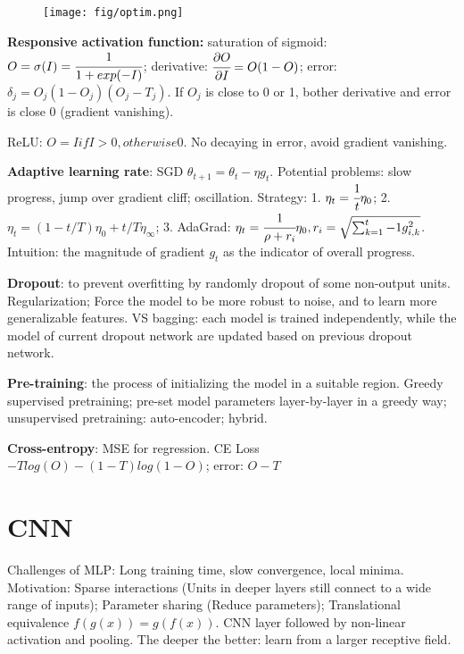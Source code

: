 \documentclass[10pt,twocolumn]{article}
\begin{document}
\begin{figure}[!ht]
\texttt{[image: fig/optim.png]}
\end{figure}

\textbf{Responsive activation function:} saturation of sigmoid: $O=\sigma(I)=\cfrac{1}{1+exp(-I)}$; derivative: $\cfrac{\partial O}{\partial I}=O(1-O)$; error: $\delta_j=O_j(1-O_j)(O_j-T_j)$. If $O_j$ is close to 0 or 1, bother derivative and error is close 0 (gradient vanishing). 

ReLU: $O=I if I >0, otherwise 0$. No decaying in error, avoid gradient vanishing. 

\textbf{Adaptive learning rate}: SGD $\theta_{t+1}=\theta_t-\eta g_t$. Potential problems: slow progress, jump over gradient cliff; oscillation. Strategy: 1. $\eta_t=\cfrac{1}{t}\eta_0$; 2. $\eta_t=(1-t/T)\eta_0+t/T\eta_\infty$; 3. AdaGrad: $\eta_t=\cfrac{1}{\rho+r_i}\eta_0, r_i=\sqrt{\sum_{k=1}^t-1{g_{i,k}^2}}$. Intuition: the magnitude of gradient $g_t$ as the indicator of overall progress. 

\textbf{Dropout}: to prevent overfitting by randomly dropout of some non-output units. Regularization; Force the model to be more robust to noise, and to learn more generalizable features. 
VS bagging: each model is trained independently, while the model of current dropout network are updated based on previous dropout network.

\textbf{Pre-training}: the process of initializing the model in a suitable region. Greedy supervised pretraining; pre-set model parameters layer-by-layer in a greedy way; unsupervised pretraining: auto-encoder; hybrid. 

\textbf{Cross-entropy}: MSE for regression. CE Loss $-Tlog(O)-(1-T)log(1-O)$; error: $O-T$

\section{CNN}
Challenges of MLP: Long training time, slow convergence, local minima. Motivation: Sparse interactions (Units in deeper layers still connect to a wide range of inputs); Parameter sharing (Reduce parameters); Translational equivalence $f(g(x))=g(f(x))$. CNN layer followed by non-linear activation and pooling. The deeper the better: learn from a larger receptive field.
\end{document}
